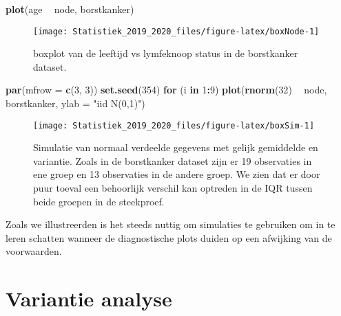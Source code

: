 \documentclass[12pt,dutch,coursenotes]{book}
\newenvironment{Shaded}{\begin{snugshade}}{\end{snugshade}}
\newcommand{\KeywordTok}[1]{\textcolor[rgb]{0.13,0.29,0.53}{\textbf{#1}}}
\newcommand{\DataTypeTok}[1]{\textcolor[rgb]{0.13,0.29,0.53}{#1}}
\newcommand{\DecValTok}[1]{\textcolor[rgb]{0.00,0.00,0.81}{#1}}
\newcommand{\StringTok}[1]{\textcolor[rgb]{0.31,0.60,0.02}{#1}}
\newcommand{\ControlFlowTok}[1]{\textcolor[rgb]{0.13,0.29,0.53}{\textbf{#1}}}
\newcommand{\OperatorTok}[1]{\textcolor[rgb]{0.81,0.36,0.00}{\textbf{#1}}}
\newcommand{\NormalTok}[1]{#1}
\theoremstyle{definition}
\theoremstyle{definition}
\theoremstyle{definition}
\theoremstyle{remark}
\begin{document}
\begin{Shaded}
\begin{Highlighting}[]
\KeywordTok{plot}\NormalTok{(age }\OperatorTok{~}\StringTok{ }\NormalTok{node, borstkanker)}
\end{Highlighting}
\end{Shaded}

\begin{figure}

{\centering \texttt{[image: Statistiek\_2019\_2020\_files/figure-latex/boxNode-1]} 

}

\caption{boxplot van de leeftijd vs lymfeknoop status in de borstkanker dataset.}\label{fig:boxNode}
\end{figure}

\begin{Shaded}
\begin{Highlighting}[]
\KeywordTok{par}\NormalTok{(}\DataTypeTok{mfrow =} \KeywordTok{c}\NormalTok{(}\DecValTok{3}\NormalTok{, }\DecValTok{3}\NormalTok{))}
\KeywordTok{set.seed}\NormalTok{(}\DecValTok{354}\NormalTok{)}
\ControlFlowTok{for}\NormalTok{ (i }\ControlFlowTok{in} \DecValTok{1}\OperatorTok{:}\DecValTok{9}\NormalTok{) }\KeywordTok{plot}\NormalTok{(}\KeywordTok{rnorm}\NormalTok{(}\DecValTok{32}\NormalTok{) }\OperatorTok{~}\StringTok{ }\NormalTok{node, borstkanker, }
    \DataTypeTok{ylab =} \StringTok{"iid N(0,1)"}\NormalTok{)}
\end{Highlighting}
\end{Shaded}

\begin{figure}

{\centering \texttt{[image: Statistiek\_2019\_2020\_files/figure-latex/boxSim-1]} 

}

\caption{Simulatie van normaal verdeelde gegevens met gelijk gemiddelde en variantie. Zoals in de borstkanker dataset zijn er 19 observaties in ene groep en 13 observaties in de andere groep. We zien dat er door puur toeval een behoorlijk verschil kan optreden in de IQR tussen beide groepen in de steekproef.}\label{fig:boxSim}
\end{figure}

Zoals we illustreerden is het steeds nuttig om simulaties te gebruiken
om in te leren schatten wanneer de diagnostische plots duiden op een
afwijking van de voorwaarden.

\chapter{Variantie analyse}\label{chap:anova}
\end{document}
